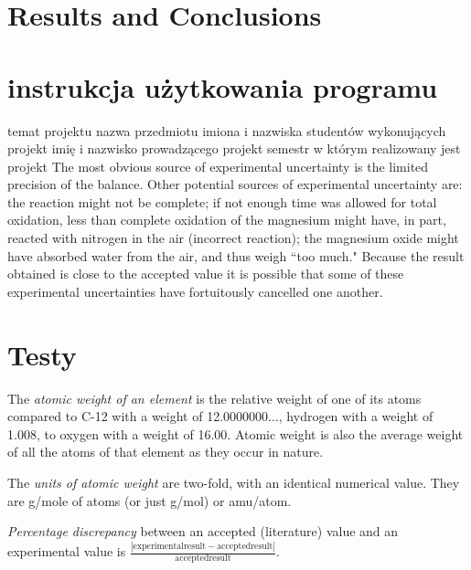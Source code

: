 \documentclass[11pt,a4paper,polish]{article}
\begin{document}
\section{Results and Conclusions}



\section{instrukcja użytkowania programu}

temat projektu
nazwa przedmiotu
imiona i nazwiska studentów wykonujących projekt
imię i nazwisko prowadzącego projekt
semestr w którym realizowany jest projekt
The most obvious source of experimental uncertainty is the limited precision of the balance. Other potential sources of experimental uncertainty are: the reaction might not be complete; if not enough time was allowed for total oxidation, less than complete oxidation of the magnesium might have, in part, reacted with nitrogen in the air (incorrect reaction); the magnesium oxide might have absorbed water from the air, and thus weigh ``too much." Because the result obtained is close to the accepted value it is possible that some of these experimental uncertainties have fortuitously cancelled one another.


\section{Testy}

\begin{enumerate}
\begin{item}
The \emph{atomic weight of an element} is the relative weight of one of its atoms compared to C-12 with a weight of 12.0000000$\ldots$, hydrogen with a weight of 1.008, to oxygen with a weight of 16.00. Atomic weight is also the average weight of all the atoms of that element as they occur in nature.
\end{item}
\begin{item}
The \emph{units of atomic weight} are two-fold, with an identical numerical value. They are g/mole of atoms (or just g/mol) or amu/atom.
\end{item}
\begin{item}
\emph{Percentage discrepancy} between an accepted (literature) value and an experimental value is $\frac{|\mathrm{experimental result} - \mathrm{accepted result}|}{\mathrm{accepted result}}$.
\end{item}
\end{enumerate}
\end{document}
